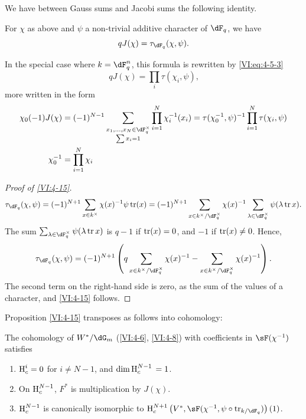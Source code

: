 We have between Gauss sums and Jacobi sums the following identity. 





\begin{proposition_}\label{VI:4-15}
For $\chi$ as above and $\psi$ a non-trivial additive character of
$\dF_q$, we have 
\[
  q J(\chi) = \tau_{\dF_q}(\chi,\psi) \text{.} 
\]
\end{proposition_}

In the special case where $k=\dF_q^n$, this formula is rewritten by
\eqref{VI:eq:4-5-3} 
\begin{equation*}\tag{4.15.1}\label{VI:eq:4-15-1}
  q J(\chi) = \prod_i \tau(\chi_i,\psi) \text{,} 
\end{equation*}
more written in the form 
\begin{align*}
  \chi_0(-1) J(\chi) &= (-1)^{N-1} \sum_{\substack{x_1,\dots,x_N\in \dF_q^\times \\ \sum x_i = 1}} \prod_{i=1}^N \chi_i^{-1}(x_i) = \tau(\chi_0^{-1},\psi)^{-1} \prod_{i=1}^N \tau(\chi_i,\psi) \\
  \chi_0^{-1} &= \prod_{i=1}^N \chi_i 
\end{align*}





\begin{proof}[Proof of \ref{VI:4-15}]
\[
  \tau_{\dF_q}(\chi,\psi) = (-1)^{N+1} \sum_{x\in k^\times} \chi(x)^{-1} \psi \tr(x) = (-1)^{N+1} \sum_{x\in k^\times/\dF_q^\times} \chi(x)^{-1} \sum_{\lambda\in \dF_q^\times} \psi(\lambda \tr x) \text{.}
\]
The sum $\sum_{\lambda\in \dF_q^\times} \psi(\lambda \tr x)$ is $q-1$ if
$\operatorname{tr}(x)=0$, and $-1$ if $\operatorname{tr}(x)\ne 0$. Hence, 
\[
  \tau_{\dF_q}(\chi,\psi) = (-1)^{N+1} \left(q\sum_{x\in k^\times/\dF_q^\times} \chi(x)^{-1} - \sum_{x\in k^\times/\dF_q^\times} \chi(x)^{-1}\right) \text{.}
\]
The second term on the right-hand side is zero, as the sum of the values of a
character, and \ref{VI:4-15} follows. 
\end{proof}

Proposition \ref{VI:4-15} transposes as follows into cohomology: 





\begin{proposition_}\label{VI:4-16}
The cohomology of $W^\ast/\dG_m$ (\ref{VI:4-6}, \ref{VI:4-8}) with coefficients
in $\sF(\chi^{-1})$ satisfies
\begin{enumerate}[\indent (i)]
  \item $\operatorname{H}_c^i=0$ for $i\ne N-1$, and $\dim \operatorname{H}_c^{N-1}{}=1$.
  \item On $\operatorname{H}_c^{N-1}$, $F^\ast$ is multiplication by $J(\chi)$.
  \item $\operatorname{H}_c^{N-1}$ is canonically isomorphic to
    $\h_c^{N+1}\left(V^\ast,\sF(\chi^{-1},\psi\circ \tr_{k/\dF_q})\right)(1)$.
\end{enumerate}
\end{proposition_}

